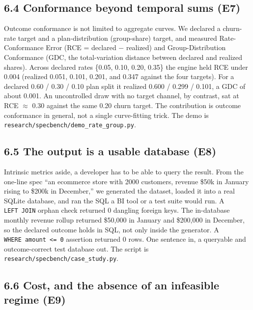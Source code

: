 \hypertarget{conformance-beyond-temporal-sums-e7}{%
\subsection{6.4 Conformance beyond temporal sums
(E7)}\label{conformance-beyond-temporal-sums-e7}}

Outcome conformance is not limited to aggregate curves. We declared a
churn-rate target and a plan-distribution (group-share) target, and
measured Rate-Conformance Error (RCE = \textbar declared \ensuremath{-}
realized\textbar) and Group-Distribution Conformance (GDC, the
total-variation distance between declared and realized shares). Across
declared rates \{0.05, 0.10, 0.20, 0.35\} the engine held RCE under
0.004 (realized 0.051, 0.101, 0.201, and 0.347 against the four
targets). For a declared 0.60 / 0.30 / 0.10 plan split it realized 0.600
/ 0.299 / 0.101, a GDC of about 0.001. An uncontrolled draw with no
target channel, by contrast, sat at RCE \ensuremath{\approx} 0.30
against the same 0.20 churn target. The contribution is outcome
conformance in general, not a single curve-fitting trick. The demo is
\texttt{research/\allowbreak{}specbench/\allowbreak{}demo\_\allowbreak{}rate\_\allowbreak{}group.py}.

\hypertarget{the-output-is-a-usable-database-e8}{%
\subsection{6.5 The output is a usable database
(E8)}\label{the-output-is-a-usable-database-e8}}

Intrinsic metrics aside, a developer has to be able to query the result.
From the one-line spec ``an ecommerce store with 2000 customers, revenue
\$50k in January rising to \$200k in December,'' we generated the
dataset, loaded it into a real SQLite database, and ran the SQL a BI
tool or a test suite would run. A \texttt{LEFT\ JOIN} orphan check
returned 0 dangling foreign keys. The in-database monthly revenue rollup
returned \$50,000 in January and \$200,000 in December, so the declared
outcome holds in SQL, not only inside the generator. A
\texttt{WHERE\ amount\ \textless{}=\ 0} assertion returned 0 rows. One
sentence in, a queryable and outcome-correct test database out. The
script is \texttt{research/\allowbreak{}specbench/\allowbreak{}case\_\allowbreak{}study.py}.

\hypertarget{cost-and-the-absence-of-an-infeasible-regime-e9}{%
\subsection{6.6 Cost, and the absence of an infeasible regime
(E9)}\label{cost-and-the-absence-of-an-infeasible-regime-e9}}

